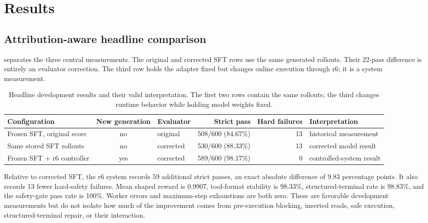 \documentclass[11pt]{article}
\begin{document}
\section{Results}
\label{sec:results}

\subsection{Attribution-aware headline comparison}

 separates the three central measurements. The original and corrected SFT rows use the same generated rollouts. Their 22-pass difference is entirely an evaluator correction. The third row holds the adapter fixed but changes online execution through r6; it is a system measurement.

\begin{table}[t]
\centering
\caption{Headline development results and their valid interpretation. The first two rows contain the same rollouts; the third changes runtime behavior while holding model weights fixed.}
\label{tab:headline}
\small
\begin{tabularx}{\textwidth}{@{}YcYrrY@{}}
\toprule
Configuration & New generation & Evaluator & Strict pass & Hard failures & Interpretation \\
\midrule
Frozen SFT, original score & no & original & 508/600 (84.67\%) & 13 & historical measurement \\
Same stored SFT rollouts & no & corrected & 530/600 (88.33\%) & 13 & corrected model result \\
Frozen SFT + r6 controller & yes & corrected & 589/600 (98.17\%) & 0 & controlled-system result \\
\bottomrule
\end{tabularx}
\end{table}

Relative to corrected SFT, the r6 system records 59 additional strict passes, an exact absolute difference of 9.83 percentage points. It also records 13 fewer hard-safety failures. Mean shaped reward is 0.9907, tool-format stability is 98.33\%, structured-terminal rate is 98.83\%, and the safety-gate pass rate is 100\%. Worker errors and maximum-step exhaustions are both zero. These are favorable development measurements but do not isolate how much of the improvement comes from pre-execution blocking, inserted reads, safe execution, structured-terminal repair, or their interaction.
\end{document}
